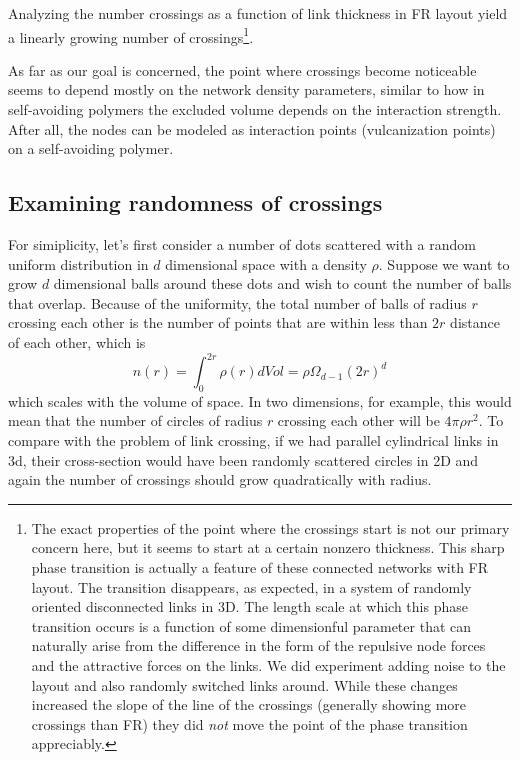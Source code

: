 \documentclass[nofootinbib,preprint,floatfix,titlepage,superscriptaddress]{revtex4} %
\begin{document}
Analyzing the number crossings as a function of link thickness in FR layout yield a linearly growing number of crossings\footnote{The exact properties of the point where the crossings start is not our primary concern here, but it seems to start at a certain nonzero thickness. 
This sharp phase transition is actually a feature of these connected networks with FR layout. The transition disappears, as expected, in a system of randomly oriented disconnected links in 3D. The length scale at which this phase transition occurs is a function of some dimensionful parameter that can naturally arise from the difference in the form of the repulsive node forces and the attractive forces on the links. We did experiment adding noise to the layout and also randomly switched links around. While these changes increased the slope of the line of the crossings (generally showing more crossings than FR) they did {\em not} move the point of the phase transition appreciably.}. 
 
As far as our goal is concerned, the point where crossings become noticeable seems to depend mostly on the network density parameters, similar to how in self-avoiding polymers the excluded volume depends on the interaction strength. 
After all, the nodes can be modeled as interaction points (vulcanization points) on a self-avoiding polymer.  


\subsection{Examining randomness of crossings}
For simiplicity, let's first consider a number of dots scattered with a random uniform distribution in $d$ dimensional space with a density $\rho$. Suppose we want to grow $d$ dimensional balls around these dots and wish to count the number of balls that overlap. Because of the uniformity, the total number of balls of radius $r$ crossing each other is the number of points that are within less than $2r$ distance of each other, which is
\begin{equation}
    n(r) = \int_0^{2r} \rho(r) dVol=\rho \Omega_{d-1} (2r)^d  \label{eq:nr}
\end{equation}
which scales with the volume of space. In two dimensions, for example, this would mean that the number of circles of radius $r$ crossing each other will be $4\pi \rho r^2$. To compare with the problem of link crossing, if we had parallel cylindrical links in 3d, their cross-section would have been randomly scattered circles in 2D and again the number of crossings should grow quadratically with radius. 
\end{document}
